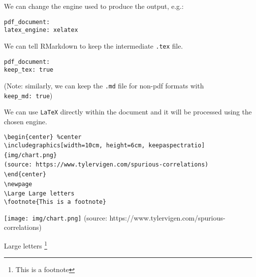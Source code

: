 \documentclass[
  11pt,
  ignorenonframetext,
]{article}
\begin{document}
\begin{frame}[fragile]

We can change the engine used to produce the output, e.g.:

\texttt{pdf\_document:}\\
\texttt{latex\_engine:\ xelatex}

\end{frame}

\begin{frame}[fragile]

We can tell RMarkdown to keep the intermediate \texttt{.tex} file.

\texttt{pdf\_document:}\\
\texttt{keep\_tex:\ true}

(Note: similarly, we can keep the \texttt{.md} file for non-pdf formats
with \texttt{keep\_md:\ true})

\end{frame}

\begin{frame}[fragile]

We can use \texttt{LaTeX} directly within the document and it will be
processed using the chosen engine.

\texttt{\textbackslash{}begin\{center\}\ \%center}\\
\texttt{\textbackslash{}includegraphics{[}width=10cm,\ height=6cm,\ keepaspectratio{]}\{img/chart.png\}}~\\
\texttt{(source:\ https://www.tylervigen.com/spurious-correlations)}~\\
\texttt{\textbackslash{}end\{center\}}~\\
\texttt{\textbackslash{}newpage}~\\
\texttt{\textbackslash{}Large\ Large\ letters}~\\
\texttt{\textbackslash{}footnote\{This\ is\ a\ footnote\}}

\begin{center} %
  \texttt{[image: img/chart.png]}  
(source: https://www.tylervigen.com/spurious-correlations)
\end{center}
\newpage

\Large Large letters \footnote{This is a footnote}

\end{frame}
\end{document}
